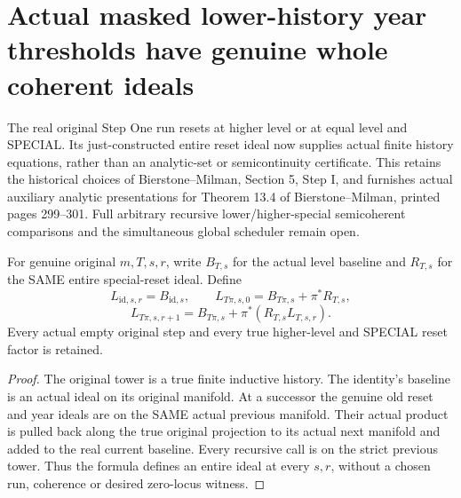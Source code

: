 \section{Actual masked lower-history year thresholds have genuine whole coherent ideals}

The real original Step One run resets at higher level or at equal level and
SPECIAL. Its just-constructed entire reset ideal now supplies actual finite
history equations, rather than an analytic-set or semicontinuity certificate.
This retains the historical choices of Bierstone--Milman\cite{bierstone-milman08-functoriality},
Section 5, Step I, and furnishes actual auxiliary analytic presentations for
Theorem 13.4 of Bierstone--Milman\cite{bierstone-milman97-invent-math},
printed pages 299--301. Full arbitrary recursive lower/higher-special
semicoherent comparisons and the simultaneous global scheduler remain open.

\begin{definition}
\label{hir:original-step-one-lower-history-year-ideal-recursion}
\leanok
{}
For genuine original $m,T,s,r$, write $B_{T,s}$ for the actual level baseline
and $R_{T,s}$ for the SAME entire special-reset ideal. Define
\[
 L_{\mathrm{id},s,r}=B_{\mathrm{id},s},\qquad
 L_{T\pi,s,0}=B_{T\pi,s}+\pi^*R_{T,s},
\]
\[
 L_{T\pi,s,r+1}=B_{T\pi,s}+\pi^*(R_{T,s}L_{T,s,r}).
\]
Every actual empty original step and every true higher-level and SPECIAL reset
factor is retained.
\end{definition}
\begin{proof}
The original tower is a true finite inductive history. The identity's baseline
is an actual ideal on its original manifold. At a successor the genuine old
reset and year ideals are on the SAME actual previous manifold. Their actual
product is pulled back along the true original projection to its actual next
manifold and added to the real current baseline. Every recursive call is on
the strict previous tower. Thus the formula defines an entire ideal at every
$s,r$, without a chosen run, coherence or desired zero-locus witness.
\end{proof}

